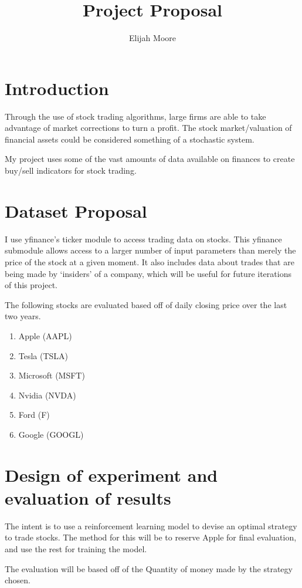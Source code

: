 \documentclass{article}
\title{Project Proposal}
\author{Elijah Moore}
\begin{document}
\maketitle
\section{Introduction}

   Through the use of stock trading algorithms, large firms are able to take advantage of market corrections
   to turn a profit. The stock market/valuation of financial assets could be considered something of a stochastic system.
   
   My project uses some of the vast amounts of data available on finances to
   create buy/sell indicators for stock trading.

\section{Dataset Proposal}
    I use yfinance's ticker module to access trading data on stocks.
    This yfinance submodule allows access to a larger number of input parameters than merely the price of the stock at a given moment.
    It also includes data about trades that are being made by `insiders' of a company, which will be useful for future iterations of this project.

    The following stocks are evaluated based off of daily closing price over the last two years.
    \begin{enumerate}
        \item Apple (AAPL)
        \item Tesla (TSLA)
        \item Microsoft (MSFT)
        \item Nvidia (NVDA)
        \item Ford (F)
        \item Google (GOOGL)
    \end{enumerate}
\section{Design of experiment and evaluation of results}

    The intent is to use a reinforcement learning model to devise an optimal strategy to trade stocks.
    The method for this will be to reserve Apple for final evaluation, and use the rest for training the model.
    
    The evaluation will be based off of the Quantity of money made by the strategy chosen.
\end{document}
